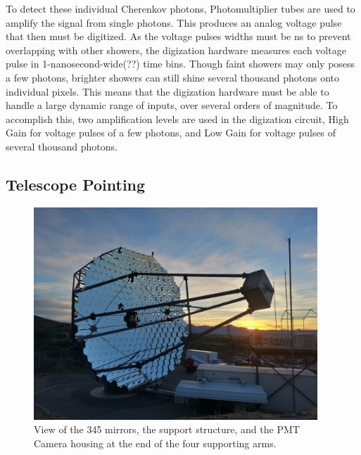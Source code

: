 To detect these individual Cherenkov photons, Photomultiplier tubes are used to amplify the signal from single photons.
This produces an analog voltage pulse that then must be digitized.
As the voltage pulses widths must be \nicetilde{}ns to prevent overlapping with other showers, the digization hardware measures each voltage pulse in 1-nanosecond-wide(??) time bins.
Though faint showers may only posess a few photons, brighter showers can still shine several thousand photons onto individual pixels.
This means that the digization hardware must be able to handle a large dynamic range of inputs, over several orders of magnitude.
To accomplish this, two amplification levels are used in the digization circuit, High Gain for voltage pulses of a few photons, and Low Gain for voltage pulses of several thousand photons.

\subsection{Telescope Pointing}

\begin{figure}[h]
  \begin{center}
    \includegraphics[width=0.95\textwidth]{images/single_telescope}
    \caption[Single Veritas Telescope]{View of the 345 mirrors, the support structure, and the PMT Camera housing at the end of the four supporting arms.}\label{fig:davcottel}
  \end{center}
\end{figure}


